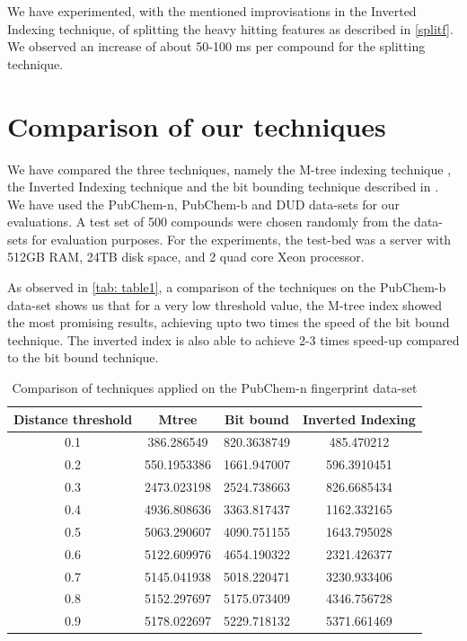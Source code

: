 We have experimented, with the mentioned improvisations in the Inverted Indexing technique, of splitting the heavy hitting features as described in \autoref{splitf}. We observed an increase of about 50-100 ms per compound for the splitting technique.

\section{Comparison of our techniques}

We have compared the three techniques, namely the M-tree indexing technique , the Inverted Indexing technique and the bit bounding technique described in \citet*{swamidass2007bounds}. We have used the PubChem-n, PubChem-b and DUD data-sets for our evaluations. A test set of 500 compounds were chosen randomly from the data-sets for evaluation purposes. For the experiments, the test-bed was a server with 512GB RAM, 24TB disk space, and 2 quad core Xeon processor. 

As observed in \autoref{tab: table1}, a comparison of the techniques on the PubChem-b data-set shows us that for a very low threshold value, the M-tree index showed the most promising results, achieving upto two times the speed of the bit bound technique. The inverted index is also able to achieve 2-3 times speed-up compared to the bit bound technique. \\



\begin{table}[ht]
\centering
\caption{Comparison of techniques applied on the PubChem-n fingerprint data-set}
\label{tab: table1}
\begin{tabular}{|c|c|c|c|}
\hline 
Distance threshold & Mtree	& Bit bound	& 	Inverted Indexing \\
\hline
0.1	& 	386.286549	& 820.3638749	&	485.470212\\
0.2	& 	550.1953386	& 1661.947007	&	596.3910451\\
0.3	& 	2473.023198	& 2524.738663	&	826.6685434\\
0.4	& 	4936.808636	& 3363.817437	&	1162.332165\\
0.5	& 	5063.290607	& 4090.751155	&	1643.795028\\
0.6	& 	5122.609976	& 4654.190322	&	2321.426377\\
0.7	& 	5145.041938	& 5018.220471	&	3230.933406\\
0.8	& 	5152.297697	& 5175.073409	&	4346.756728\\
0.9	& 	5178.022697	& 5229.718132	&	5371.661469\\
\hline 
\end{tabular} 
\end{table}


